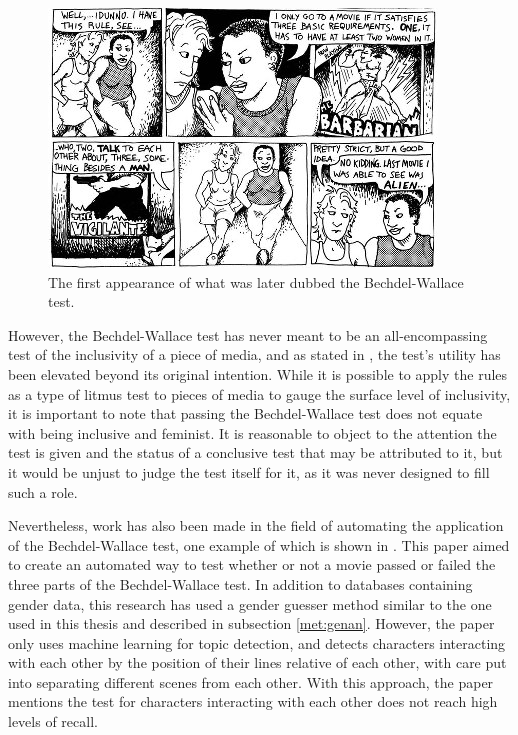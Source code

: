 \documentclass[a4paper, 11pt]{article}
\begin{document}
\begin{figure}[h!]
  \includegraphics[width=\linewidth]{figures/bechdel.jpg}
  \caption{The first appearance of what was later dubbed the Bechdel-Wallace test. \citep{bechdel}}
  \label{fig:bechdel}
\end{figure}

However, the Bechdel-Wallace test has never meant to be an all-encompassing test of the inclusivity of a piece of media, and as stated in \citet{zeisler}, the test's utility has been elevated beyond its original intention. While it is possible to apply the rules as a type of litmus test to pieces of media to gauge the surface level of inclusivity, it is important to note that passing the Bechdel-Wallace test does not equate with being inclusive and feminist. It is reasonable to object to the attention the test is given and the status of a conclusive test that may be attributed to it, but it would be unjust to judge the test itself for it, as it was never designed to fill such a role.

Nevertheless, work has also been made in the field of automating the application of the Bechdel-Wallace test, one example of which is shown in \citet{otherbechdelresearch}. This paper aimed to create an automated way to test whether or not a movie passed or failed the three parts of the Bechdel-Wallace test. In addition to databases containing gender data, this research has used a gender guesser method similar to the one used in this thesis and described in subsection \ref{met:genan}. However, the paper only uses machine learning for topic detection, and detects characters interacting with each other by the position of their lines relative of each other, with care put into separating different scenes from each other. With this approach, the paper mentions the test for characters interacting with each other does not reach high levels of recall.
\end{document}
